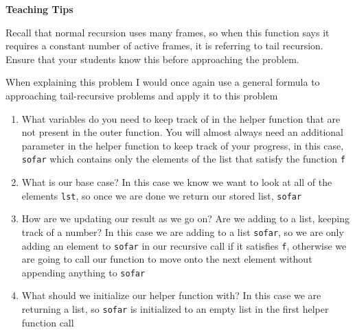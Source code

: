 \begin{guide}
\begin{blocksection}
\textbf{Teaching Tips}

  Recall that normal recursion uses many frames, so when this function says it requires a constant number of active frames, it is referring to tail recursion. Ensure that your students know this before approaching the problem.

  When explaining this problem I would once again use a general formula to approaching tail-recursive problems and apply it to this problem
  \begin{enumerate}
    \item What variables do you need to keep track of in the helper function that are not present in the outer function. You will almost always need an additional parameter in the helper function to keep track of your progress, in this case, \lstinline{sofar} which contains only the elements of the list that satisfy the function \lstinline{f}
    \item What is our base case? In this case we know we want to look at all of the elements \lstinline{lst}, so once we are done we return our stored list, \lstinline{sofar}
    \item How are we updating our result as we go on? Are we adding to a list, keeping track of a number? In this case we are adding to a list \lstinline{sofar}, so we are only adding an element to \lstinline{sofar} in our recursive call if it satisfies \lstinline{f}, otherwise we are going to call our function to move onto the next element without appending anything to \lstinline{sofar}
    \item What should we initialize our helper function with? In this case we are returning a list, so \lstinline{sofar} is initialized to an empty list in the first helper function call
  \end{enumerate}
\end{blocksection}
\end{guide}
